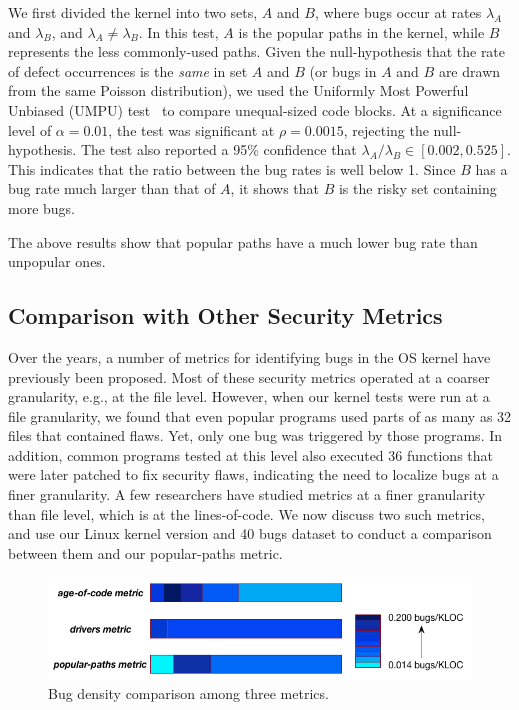 We first divided the kernel into two sets,
$A$ and $B$, where bugs occur at rates $\lambda_A$ and
$\lambda_B$, and $\lambda_A \neq \lambda_B$. In this test, $A$ is the popular
paths in the kernel, while $B$
represents the less commonly-used paths. Given the null-hypothesis
that the rate of defect occurrences is the \textit{same} in set $A$ and $B$
(or bugs in $A$ and $B$ are drawn from the same Poisson distribution),
we used the Uniformly Most Powerful Unbiased (UMPU) test~\cite{shiue1982experiment}
to compare unequal-sized code blocks.
At a significance level of $\alpha=0.01$, the test was significant at
$\rho=0.0015$, rejecting the null-hypothesis.
The test also reported a 95\% confidence that $\lambda_A / \lambda_B
\in [0.002, 0.525]$. This indicates that the ratio between the bug rates is well
below 1. Since $B$ has a bug rate much larger than that of $A$, it shows 
that $B$ is the risky set containing more bugs. 

The above results show that
popular paths have a much lower bug rate than unpopular ones.

\subsection{Comparison with Other Security Metrics}

Over the years, a number of metrics for identifying bugs in the OS kernel have
previously been proposed. Most of these security metrics operated at a coarser granularity,
e.g., at the file level. However, when our kernel tests were run at a file
granularity, we found that even popular programs used parts of as many as
32 files that contained flaws. Yet, only one bug was triggered by those programs.
In addition, common programs tested at this level also executed 36 functions
that were later patched to fix security
flaws, indicating the need to localize bugs at a finer granularity.
A few researchers have studied metrics at a finer granularity than file level, which
is at the lines-of-code.
We now discuss two such metrics, and use our Linux kernel version and 40 bugs dataset
to conduct a comparison between them and our popular-paths metric.

\begin{figure}
\centering
\includegraphics[width=1.2\columnwidth]{diagram/bug_density.png}
\caption{\small Bug density comparison among three metrics.}
\label{fig:bug_density}
\end{figure}

